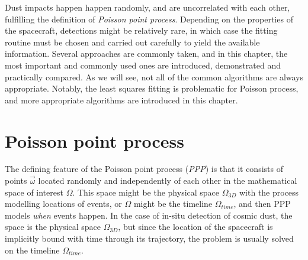 Dust impacts happen happen randomly, and are uncorrelated with each other, fulfilling the definition of \textit{Poisson point process}. Depending on the properties of the spacecraft, detections might be relatively rare, in which case the fitting routine must be chosen and carried out carefully to yield the available information. Several approaches are commonly taken, and in this chapter, the most important and commonly used ones are introduced, demonstrated and practically compared. As we will see, not all of the common algorithms are always appropriate. Notably, the least squares fitting is problematic for Poisson process, and more appropriate algorithms are introduced in this chapter.

\section{Poisson point process}

The defining feature of the Poisson point process (\textit{PPP}) is that it consists of points $\vec{\omega}$ located randomly and independently of each other in the mathematical space of interest $\Omega$. This space might be the physical space $\Omega_{3D}$ with the process modelling locations of events, or $\Omega$ might be the timeline $\Omega_{time}$, and then PPP models \textit{when} events happen. In the case of in-situ detection of cosmic dust, the space is the physical space $\Omega_{3D}$, but since the location of the spacecraft is implicitly bound with time through its trajectory, the problem is usually solved on the timeline $\Omega_{time}$.


